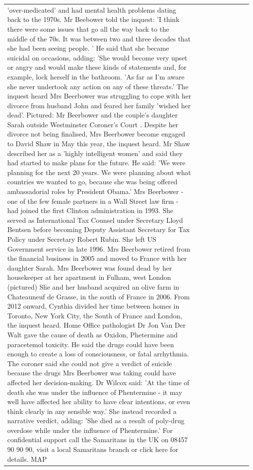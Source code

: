 \begin{table}[H]
\begin{tabular}{lllrlllll}
'over-medicated' and had mental health problems dating back to the 1970s. Mr Beebower told the inquest: 'I think there were some issues that go all the way back to the middle of the 70s. It was between two and three decades that she had been seeing people. ' He said that she became suicidal on occasions, adding: 'She would become very upset or angry and would make these kinds of statements and, for example, lock herself in the bathroom. 'As far as I'm aware she never undertook any action on any of these threats.' The inquest heard Mrs Beerbower was struggling to cope with her divorce from husband John and feared her family 'wished her dead'. Pictured: Mr Beerbower and the couple's daughter Sarah outside Westminster Coroner's Court . Despite her divorce not being finalised, Mrs Beerbower become engaged to David Shaw in May this year, the inquest heard. Mr Shaw described her as a 'highly intelligent women' and said they had started to make plans for the future. He said: 'We were planning for the next 20 years. We were planning about what countries we wanted to go, because she was being offered ambassadorial roles by President Obama.' Mrs Beerbower - one of the few female partners in a Wall Street law firm - had joined the first Clinton administration in 1993. She served as International Tax Counsel under Secretary Lloyd Bentsen before becoming Deputy Assistant Secretary for Tax Policy under Secretary Robert Rubin. She left US Government service in late 1996. Mrs Beerbower retired from the financial business in 2005 and moved to France with her daughter Sarah. Mrs Beerbower was found dead by her housekeeper at her apartment in Fulham, west London (pictured) She and her husband acquired an olive farm in Chateauneuf de Grasse, in the south of France in 2006. From 2012 onward, Cynthia divided her time between homes in Toronto, New York City, the South of France and London, the inquest heard. Home Office pathologist Dr Jon Van Der Walt gave the cause of death as Oxidon, Phetermine and paracetemol toxicity. He said the drugs could have been enough to create a loss of consciousness, or fatal arrhythmia. The coroner said she could not give a verdict of suicide because the drugs Mrs Beerbower was taking could have affected her decision-making. Dr Wilcox said: 'At the time of death she was under the influence of Phentermine - it may well have affected her ability to have clear intentions, or even think clearly in any sensible way.' She instead recorded a narrative verdict, adding: 'She died as a result of poly-drug overdose while under the influence of Phentermine.' For confidential support call the Samaritans in the UK on 08457 90 90 90, visit a local Samaritans branch or click here for details. MAP \\

\end{tabular}
\end{table}
